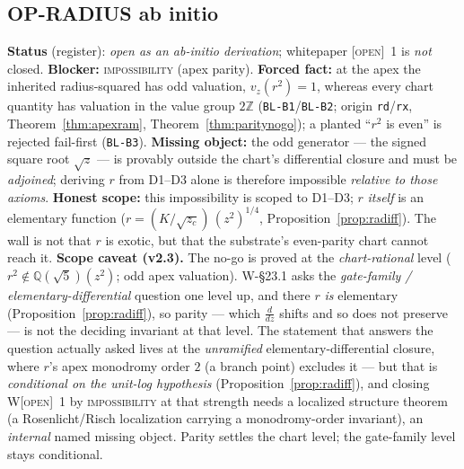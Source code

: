 \documentclass[11pt]{article}
\newcommand{\tagO}{\textcolor{cO}{\textsc{[open]}}}
\newcommand{\hx}[1]{\textcolor{cC}{\footnotesize\texttt{#1}}}
\newcommand{\Q}{\mathbb{Q}}
\newcommand{\Z}{\mathbb{Z}}
\theoremstyle{plain}
\theoremstyle{definition}
\theoremstyle{remark}
\begin{document}
\subsection{OP-RADIUS ab initio}\label{blk:radab}
\textbf{Status} (register): \emph{open as an ab-initio derivation}; whitepaper
\tagO{}~1 is \emph{not} closed. \textbf{Blocker:} \textsc{impossibility} (apex
parity). \textbf{Forced fact:} at the apex the inherited radius-squared has odd
valuation, $v_z(r^2)=1$, whereas every chart quantity has valuation in the value
group $2\Z$ (\hx{BL-B1}/\hx{BL-B2}; origin \texttt{rd}/\texttt{rx},
Theorem~\ref{thm:apexram}, Theorem~\ref{thm:paritynogo}); a planted ``$r^2$ is
even'' is rejected fail-first (\hx{BL-B3}). \textbf{Missing object:} the odd
generator --- the signed square root $\sqrt z$ --- is provably outside the
chart's differential closure and must be \emph{adjoined}; deriving $r$ from
D1--D3 alone is therefore impossible \emph{relative to those axioms}.
\textbf{Honest scope:} this impossibility is scoped to D1--D3; $r$ \emph{itself}
is an elementary function ($r=(K/\sqrt{z_c})\,(z^2)^{1/4}$,
Proposition~\ref{prop:radiff}). The wall is not that $r$ is exotic, but that the
substrate's even-parity chart cannot reach it.
\textbf{Scope caveat (v2.3).} The no-go is proved at the \emph{chart-rational}
level ($r^2\notin\Q(\sqrt5)(z^2)$; odd apex valuation). W-\S23.1 asks the
\emph{gate-family / elementary-differential} question one level up, and there $r$
\emph{is} elementary (Proposition~\ref{prop:radiff}), so parity --- which
$\tfrac{d}{dz}$ shifts and so does not preserve --- is not the deciding invariant
at that level. The statement that answers the question actually asked lives at the
\emph{unramified} elementary-differential closure, where $r$'s apex monodromy
order $2$ (a branch point) excludes it --- but that is \emph{conditional on the
unit-log hypothesis} (Proposition~\ref{prop:radiff}), and closing W\tagO{}~1 by
\textsc{impossibility} at that strength needs a localized structure theorem (a
Rosenlicht/Risch localization carrying a monodromy-order invariant), an
\emph{internal} named missing object. Parity settles the chart level; the
gate-family level stays conditional.
\end{document}
